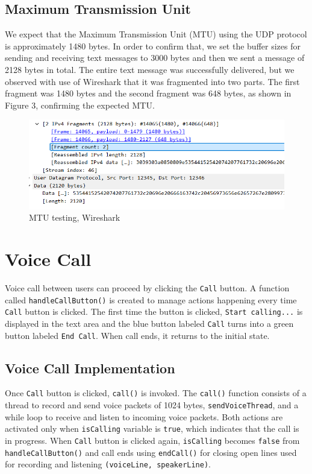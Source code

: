 \documentclass{article}
\begin{document}
\subsection{Maximum Transmission Unit}
We expect that the Maximum Transmission Unit (MTU) using the UDP protocol is approximately 1480 bytes. In order to confirm that, we set the buffer sizes for sending and receiving text messages to 3000 bytes and then we sent a message of 2128 bytes in total. The entire text message was successfully delivered, but we observed with use of Wireshark that it was fragmented into two parts. The first fragment was 1480 bytes and the second fragment was 648 bytes, as shown in Figure 3, confirming the expected MTU.

\begin{figure}[h!]
    \centering
    \includegraphics[width=1\linewidth]{image3.png}
    \caption{MTU testing, Wireshark}
    \label{fig:enter-label}
\end{figure}

\section{Voice Call}
Voice call between users can proceed by clicking the \texttt{Call} button. A function called \texttt{handleCallButton()} is created to manage actions happening every time \texttt{Call} button is clicked. The first time the button is clicked, \texttt{Start calling...} is displayed in the text area and the blue button labeled \texttt{Call} turns into a green button labeled \texttt{End Call}. When call ends, it returns to the initial state.

\subsection{Voice Call Implementation}
Once \texttt{Call} button is clicked, \texttt{call()} is invoked. The \texttt{call()} function consists of a thread to record and send voice packets of 1024 bytes, \texttt{sendVoiceThread}, and a while loop to receive and listen to incoming voice packets. Both actions are activated only when \texttt{isCalling} variable is \texttt{true}, which indicates that the call is in progress. When \texttt{Call} button is clicked again, \texttt{isCalling} becomes \texttt{false} from \texttt{handleCallButton()} and call ends using \texttt{endCall()} for closing open lines used for recording and listening \texttt{(voiceLine, speakerLine)}.
\newline
\end{document}
